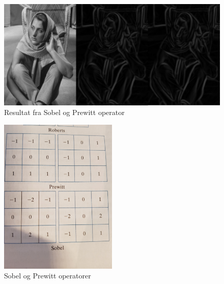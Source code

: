\documentclass[a4paper, 12pt]{article}
\begin{document}
\begin{figure}[h]
  \centering
  \includegraphics[width=1.0\textwidth]{images/barbara_prewitt_sobel}
  \caption{Resultat fra Sobel og Prewitt operator}
  \label{fig:sobprew}
\end{figure}

\begin{figure}[h]
  \centering
  \includegraphics[width=0.5\textwidth, angle=270]{images/matrix}
  \caption{Sobel og Prewitt operatorer}
  \label{fig:mat}
\end{figure}
\end{document}
